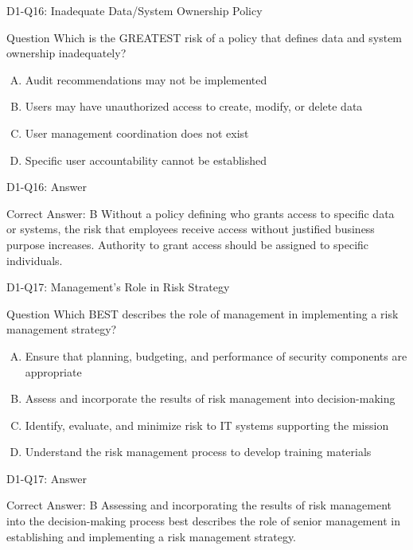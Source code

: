 \documentclass{beamer}
\begin{document}
	\begin{frame}{D1-Q16: Inadequate Data/System Ownership Policy}
		\begin{block}{Question}
			Which is the GREATEST risk of a policy that defines data and system ownership inadequately?
		\end{block}
		\begin{enumerate}[(A)]
			\item Audit recommendations may not be implemented
			\item Users may have unauthorized access to create, modify, or delete data
			\item User management coordination does not exist
			\item Specific user accountability cannot be established
		\end{enumerate}
	\end{frame}
	\begin{frame}{D1-Q16: Answer}
		\begin{block}{Correct Answer: B}
			Without a policy defining who grants access to specific data or systems, the risk that employees receive access without justified business purpose increases. Authority to grant access should be assigned to specific individuals.
		\end{block}
	\end{frame}
	
	\begin{frame}{D1-Q17: Management's Role in Risk Strategy}
		\begin{block}{Question}
			Which BEST describes the role of management in implementing a risk management strategy?
		\end{block}
		\begin{enumerate}[(A)]
			\item Ensure that planning, budgeting, and performance of security components are appropriate
			\item Assess and incorporate the results of risk management into decision-making
			\item Identify, evaluate, and minimize risk to IT systems supporting the mission
			\item Understand the risk management process to develop training materials
		\end{enumerate}
	\end{frame}
	\begin{frame}{D1-Q17: Answer}
		\begin{block}{Correct Answer: B}
			Assessing and incorporating the results of risk management into the decision-making process best describes the role of senior management in establishing and implementing a risk management strategy.
		\end{block}
	\end{frame}
	
\end{document}
